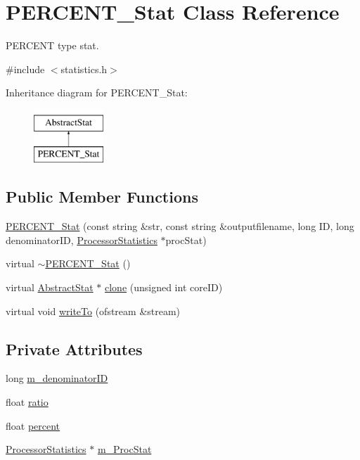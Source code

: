 \hypertarget{classPERCENT__Stat}{
\section{PERCENT\_\-Stat Class Reference}
\label{classPERCENT__Stat}
}


PERCENT type stat.  




{\ttfamily \#include $<$statistics.h$>$}

Inheritance diagram for PERCENT\_\-Stat:\begin{figure}[H]
\begin{center}
\leavevmode
\includegraphics[height=2.000000cm]{classPERCENT__Stat}
\end{center}
\end{figure}
\subsection*{Public Member Functions}
\begin{DoxyCompactItemize}
\item 
\hyperlink{classPERCENT__Stat_a75de30141ea55a2219a4d9fcb6b9097b}{PERCENT\_\-Stat} (const string \&str, const string \&outputfilename, long ID, long denominatorID, \hyperlink{classProcessorStatistics}{ProcessorStatistics} $\ast$procStat)
\item 
virtual \hyperlink{classPERCENT__Stat_a0b1d53d550e454d48d0103c321159d9d}{$\sim$PERCENT\_\-Stat} ()
\item 
virtual \hyperlink{classAbstractStat}{AbstractStat} $\ast$ \hyperlink{classPERCENT__Stat_addd937bd0a1e3649ee2fb6e336ef5955}{clone} (unsigned int coreID)
\item 
virtual void \hyperlink{classPERCENT__Stat_a927dba3cbaf53d4bc05de92f682f9c80}{writeTo} (ofstream \&stream)
\end{DoxyCompactItemize}
\subsection*{Private Attributes}
\begin{DoxyCompactItemize}
\item 
long \hyperlink{classPERCENT__Stat_a0079cc34c77679a78843bf6788e7e4b3}{m\_\-denominatorID}
\item 
float \hyperlink{classPERCENT__Stat_acceb28a0ccaf48ba31b576c0f88b1303}{ratio}
\item 
float \hyperlink{classPERCENT__Stat_a51c6f05b501728724644b0a831abd1eb}{percent}
\item 
\hyperlink{classProcessorStatistics}{ProcessorStatistics} $\ast$ \hyperlink{classPERCENT__Stat_aaa7e252b1f03c04d1f16b78f360cc601}{m\_\-ProcStat}
\end{DoxyCompactItemize}


